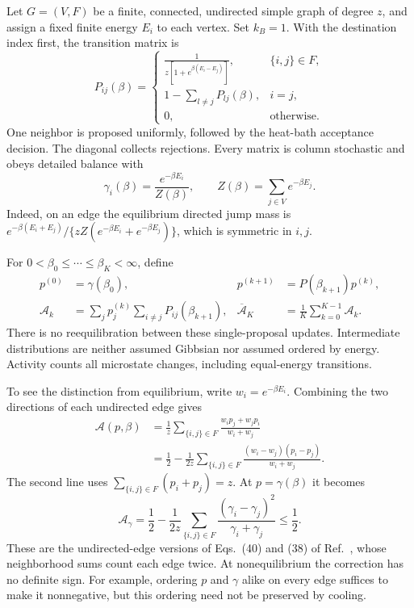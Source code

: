 \documentclass[aps,pre,reprint,longbibliography,nofootinbib,floatfix]{revtex4-2}
\newcommand{\Act}{\mathcal A}
\begin{document}
Let $G=(V,F)$ be a finite, connected, undirected simple graph of degree $z$,
and assign a fixed finite energy $E_i$ to each vertex. Set $k_B=1$.
With the destination index first, the transition matrix is
\begin{equation}
P_{ij}(\beta)=
\begin{cases}
\displaystyle\frac{1}{z[1+e^{\beta(E_i-E_j)}]},&\{i,j\}\in F,\\[4pt]
\displaystyle1-\sum_{l\ne j}P_{lj}(\beta),&i=j,\\
0,&\text{otherwise}.
\end{cases}
\label{eq:kernel}
\end{equation}
One neighbor is proposed uniformly, followed by the heat-bath acceptance
decision. The diagonal collects rejections. Every matrix is column stochastic
and obeys detailed balance with
\begin{equation}
\gamma_i(\beta)=\frac{e^{-\beta E_i}}{Z(\beta)},\qquad
Z(\beta)=\sum_{j\in V}e^{-\beta E_j}.
\label{eq:gibbs}
\end{equation}
Indeed, on an edge the equilibrium directed jump mass is
$e^{-\beta(E_i+E_j)}/\{zZ(e^{-\beta E_i}+e^{-\beta E_j})\}$,
which is symmetric in $i,j$.

For $0<\beta_0\leq\cdots\leq\beta_K<\infty$, define
\begin{align}
p^{(0)}&=\gamma(\beta_0),&
p^{(k+1)}&=P(\beta_{k+1})p^{(k)},\label{eq:evolution}\\
\Act_k&=\sum_jp_j^{(k)}\sum_{i\ne j}P_{ij}(\beta_{k+1}),&
\overline{\Act}_K&=\frac1K\sum_{k=0}^{K-1}\Act_k.
\label{eq:activity}
\end{align}
There is no reequilibration between these single-proposal updates. Intermediate
distributions are neither assumed Gibbsian nor assumed ordered by energy.
Activity counts all microstate changes, including equal-energy transitions.

To see the distinction from equilibrium, write $w_i=e^{-\beta E_i}$.
Combining the two directions of each undirected edge gives
\begin{align}
\Act(p,\beta)
&=\frac1z\sum_{\{i,j\}\in F}\frac{w_ip_j+w_jp_i}{w_i+w_j}\nonumber\\
&=\frac12-\frac1{2z}\sum_{\{i,j\}\in F}
\frac{(w_i-w_j)(p_i-p_j)}{w_i+w_j}.
\label{eq:edge}
\end{align}
The second line uses $\sum_{\{i,j\}\in F}(p_i+p_j)=z$.
At $p=\gamma(\beta)$ it becomes
\begin{equation}
\Act_\gamma=\frac12-\frac1{2z}\sum_{\{i,j\}\in F}
\frac{(\gamma_i-\gamma_j)^2}{\gamma_i+\gamma_j}\leq\frac12.
\label{eq:equilibrium}
\end{equation}
These are the undirected-edge versions of Eqs.~(40) and (38) of
Ref.~\cite{LuoDetailed}, whose neighborhood sums count each edge twice.
At nonequilibrium the correction has no definite sign. For example, ordering
$p$ and $\gamma$ alike on every edge suffices to make it nonnegative, but
this ordering need not be preserved by cooling.
\end{document}
